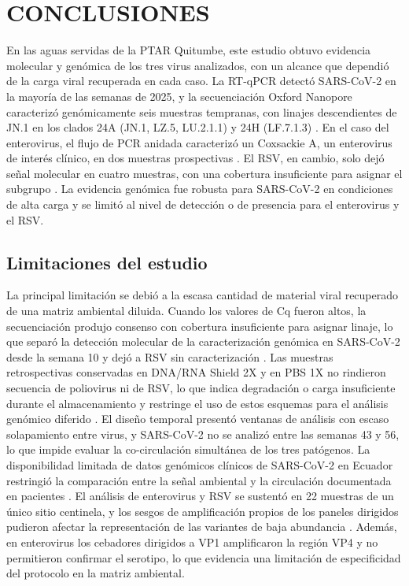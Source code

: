 \section{CONCLUSIONES}

En las aguas servidas de la PTAR Quitumbe, este estudio obtuvo evidencia molecular y genómica de los tres virus analizados, con un alcance que dependió de la carga viral recuperada en cada caso. La RT-qPCR detectó SARS-CoV-2 en la mayoría de las semanas de 2025, y la secuenciación Oxford Nanopore caracterizó genómicamente seis muestras tempranas, con linajes descendientes de JN.1 en los clados 24A (JN.1, LZ.5, LU.2.1.1) y 24H (LF.7.1.3) \cite{MejiaCalle_2024,Crits_Christoph_2021}. En el caso del enterovirus, el flujo de PCR anidada caracterizó un Coxsackie A, un enterovirus de interés clínico, en dos muestras prospectivas \cite{Bubba_2023,Asghar_2014}. El RSV, en cambio, solo dejó señal molecular en cuatro muestras, con una cobertura insuficiente para asignar el subgrupo \cite{Le_2025,Hughes_2022}. La evidencia genómica fue robusta para SARS-CoV-2 en condiciones de alta carga y se limitó al nivel de detección o de presencia para el enterovirus y el RSV.

\subsection{Limitaciones del estudio}

La principal limitación se debió a la escasa cantidad de material viral recuperado de una matriz ambiental diluida. Cuando los valores de Cq fueron altos, la secuenciación produjo consenso con cobertura insuficiente para asignar linaje, lo que separó la detección molecular de la caracterización genómica en SARS-CoV-2 desde la semana 10 y dejó a RSV sin caracterización \cite{Parkins_2023,Child_2023}. Las muestras retrospectivas conservadas en DNA/RNA Shield 2X y en PBS 1X no rindieron secuencia de poliovirus ni de RSV, lo que indica degradación o carga insuficiente durante el almacenamiento y restringe el uso de estos esquemas para el análisis genómico diferido \cite{MejiaCalle_2024}. El diseño temporal presentó ventanas de análisis con escaso solapamiento entre virus, y SARS-CoV-2 no se analizó entre las semanas 43 y 56, lo que impide evaluar la co-circulación simultánea de los tres patógenos. La disponibilidad limitada de datos genómicos clínicos de SARS-CoV-2 en Ecuador restringió la comparación entre la señal ambiental y la circulación documentada en pacientes \cite{Bruno_2025}. El análisis de enterovirus y RSV se sustentó en 22 muestras de un único sitio centinela, y los sesgos de amplificación propios de los paneles dirigidos pudieron afectar la representación de las variantes de baja abundancia \cite{Child_2023}. Además, en enterovirus los cebadores dirigidos a VP1 amplificaron la región VP4 y no permitieron confirmar el serotipo, lo que evidencia una limitación de especificidad del protocolo en la matriz ambiental.

